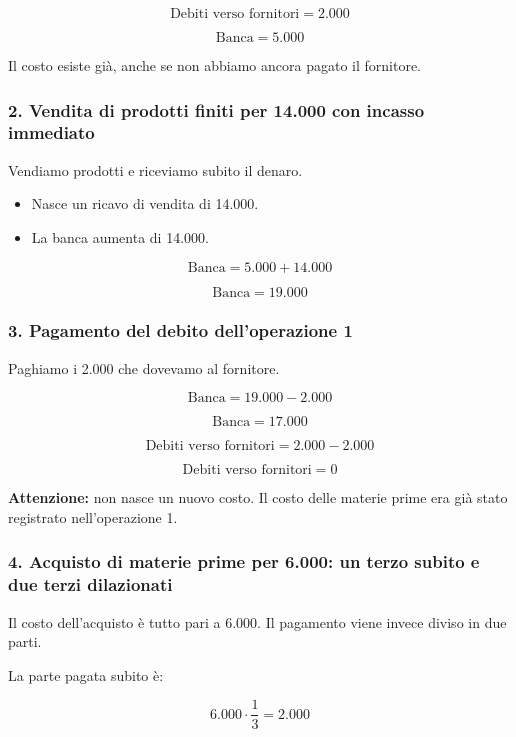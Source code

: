 \[
\text{Debiti verso fornitori}=2.000
\]

\[
\boxed{\text{Banca}=5.000}
\]

\noindent Il costo esiste già, anche se non abbiamo
ancora pagato il fornitore.

\subsubsection*{2. Vendita di prodotti finiti per 14.000
con incasso immediato}

\noindent Vendiamo prodotti e riceviamo subito
il denaro.

\begin{itemize}
    \item Nasce un ricavo di vendita di 14.000.
    \item La banca aumenta di 14.000.
\end{itemize}

\[
\text{Banca}=5.000+14.000
\]

\[
\boxed{\text{Banca}=19.000}
\]

\subsubsection*{3. Pagamento del debito dell'operazione 1}

\noindent Paghiamo i 2.000 che dovevamo al fornitore.

\[
\text{Banca}=19.000-2.000
\]

\[
\boxed{\text{Banca}=17.000}
\]

\[
\text{Debiti verso fornitori}=2.000-2.000
\]

\[
\boxed{\text{Debiti verso fornitori}=0}
\]

\noindent \textbf{Attenzione:} non nasce un nuovo costo.
Il costo delle materie prime era già stato registrato
nell'operazione 1.

\subsubsection*{4. Acquisto di materie prime per 6.000:
un terzo subito e due terzi dilazionati}

\noindent Il costo dell'acquisto è tutto pari a 6.000.
Il pagamento viene invece diviso in due parti.

\medskip

\noindent La parte pagata subito è:

\[
6.000\cdot\frac{1}{3}=2.000
\]

